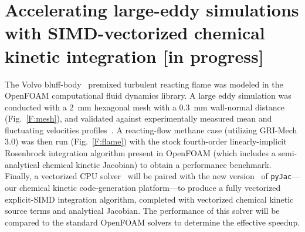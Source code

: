 \documentclass[a4paper,10pt]{article}
\begin{document}
\section{Accelerating large-eddy simulations with SIMD-vectorized chemical kinetic integration [in progress]}
The Volvo bluff-body~\cite{sjunnesson1991validation,sjunnesson1991lda} premixed turbulent reacting flame was modeled in the OpenFOAM computational fluid dynamics library.
A large eddy simulation was conducted with a \SI{2}{\milli\meter} hexagonal mesh with a \SI{0.3}{\milli\meter} wall-normal distance (Fig.~\ref{F:mesh}), and validated against experimentally measured mean and fluctuating velocities profiles~\cite{sjunnesson1991validation,sjunnesson1991lda}.
A reacting-flow methane case (utilizing GRI-Mech 3.0) was then run (Fig.~\ref{F:flame}) with the stock fourth-order linearly-implicit Rosenbrock integration algorithm present in OpenFOAM (which includes a semi-analytical chemical kinetic Jacobian) to obtain a performance benchmark.
Finally, a vectorized CPU solver~\cite{STONE201818} will be paired with the new version~ of \texttt{pyJac}---our chemical kinetic code-generation platform---to produce a fully vectorized explicit-SIMD integration algorithm, completed with vectorized chemical kinetic source terms and analytical Jacobian.
The performance of this solver will be compared to the standard OpenFOAM solvers to determine the effective speedup.
\end{document}
